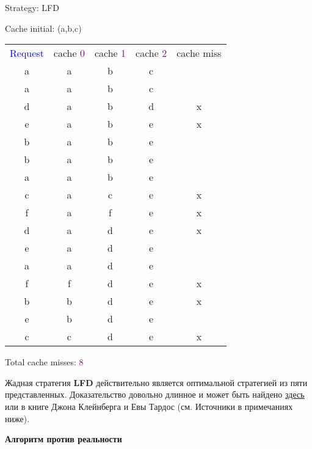 \begin{tcolorbox}
{
Strategy: LFD

\vspace{\baselineskip}

Cache initial: (a,b,c)

\vspace{\baselineskip}
\begin{tabular}{*{5}{c}}
\textcolor{Blue}{Request} & cache \textcolor{Purple}{0} & cache \textcolor{Purple}{1} & cache \textcolor{Purple}{2} & cache miss \\
a & a & b & c & \ \\
a & a & b & c & \ \\
d & a & b & d & x \\
e & a & b & e & x \\
b & a & b & e & \ \\
b & a & b & e & \ \\
a & a & b & e & \ \\
c & a & c & e & x \\
f & a & f & e & x \\
d & a & d & e & x \\
e & a & d & e & \ \\
a & a & d & e & \ \\
f & f & d & e & x \\
b & b & d & e & x \\
e & b & d & e & \ \\
c & c & d & e & x \\
\end{tabular}

\vspace{\baselineskip}

Total cache misses: \textcolor{Purple}{8}}
\end{tcolorbox}

\setlength{\tabcolsep}{6pt}
\vspace{\baselineskip}

Жадная стратегия \textbf{LFD} действительно является оптимальной стратегией из пяти представленных. Доказательство довольно длинное и может быть найдено \href{https://blog.henrypoon.com/blog/2014/02/02/proof-of-the-farthest-in-future-optimal-caching-algorithm/}{\underline{здесь}} или в книге Джона Клейнберга и Евы Тардос (см. Источники в примечаниях ниже).

\vspace{\baselineskip}

\textbf{Алгоритм против реальности}

